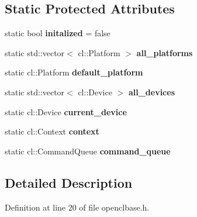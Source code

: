 \subsection*{Static Protected Attributes}
\begin{DoxyCompactItemize}
\item 
static bool {\bfseries initalized} = false\hypertarget{class_open_c_l_base_a2997ab9d1786b65b839bc8a846cb22bc}{}\label{class_open_c_l_base_a2997ab9d1786b65b839bc8a846cb22bc}

\item 
static std\+::vector$<$ cl\+::\+Platform $>$ {\bfseries all\+\_\+platforms}\hypertarget{class_open_c_l_base_a34b629eb54abe9c731c12b43c5c499e6}{}\label{class_open_c_l_base_a34b629eb54abe9c731c12b43c5c499e6}

\item 
static cl\+::\+Platform {\bfseries default\+\_\+platform}\hypertarget{class_open_c_l_base_a8fae587affeecdbf08123432ff62d3ca}{}\label{class_open_c_l_base_a8fae587affeecdbf08123432ff62d3ca}

\item 
static std\+::vector$<$ cl\+::\+Device $>$ {\bfseries all\+\_\+devices}\hypertarget{class_open_c_l_base_af84e325840c290d1c00c07dc7dcbd206}{}\label{class_open_c_l_base_af84e325840c290d1c00c07dc7dcbd206}

\item 
static cl\+::\+Device {\bfseries current\+\_\+device}\hypertarget{class_open_c_l_base_ae71fe0c479323487f3a30d0943b3bcbe}{}\label{class_open_c_l_base_ae71fe0c479323487f3a30d0943b3bcbe}

\item 
static cl\+::\+Context {\bfseries context}\hypertarget{class_open_c_l_base_a21535e1d11380faaa4d2db24a1ac0281}{}\label{class_open_c_l_base_a21535e1d11380faaa4d2db24a1ac0281}

\item 
static cl\+::\+Command\+Queue {\bfseries command\+\_\+queue}\hypertarget{class_open_c_l_base_a72f50d1b0d5ec52cbe5fff3c75a5749f}{}\label{class_open_c_l_base_a72f50d1b0d5ec52cbe5fff3c75a5749f}

\end{DoxyCompactItemize}


\subsection{Detailed Description}


Definition at line 20 of file openclbase.\+h.


